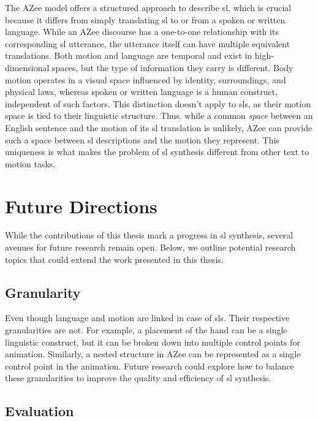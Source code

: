 \documentclass[../../main.tex]{subfiles}
\begin{document}
The AZee model offers a structured approach to describe \gls{sl}, which is crucial because it differs from simply translating \gls{sl} to or from a spoken or written language. While an AZee discourse has a one-to-one relationship with its corresponding \gls{sl} utterance, the utterance itself can have multiple equivalent translations. Both motion and language are temporal and exist in high-dimensional spaces, but the type of information they carry is different. Body motion operates in a visual space influenced by identity, surroundings, and physical laws, whereas spoken or written language is a human construct, independent of such factors. This distinction doesn't apply to \gls{sl}s, as their motion space is tied to their linguistic structure. Thus. while a common \emph{space} between an English sentence and the motion of its \gls{sl} translation is unlikely, AZee can provide such a space between \gls{sl} descriptions and the motion they represent. This uniqueness is what makes the problem of \gls{sl} synthesis different from other text to motion tasks.

\section{Future Directions}
\label{ch:conclusion:future}

While the contributions of this thesis mark a progress in \gls{sl} synthesis, several avenues for future research remain open. Below, we outline potential research topics that could extend the work presented in this thesis.

\subsection{Granularity}
\label{ch:conclusion:future:granularity}

Even though language and motion are linked in case of \gls{sl}s. Their respective granularities are not. For example, a placement of the hand can be a single linguistic construct, but it can be broken down into multiple control points for animation. Similarly, a nested structure in AZee can be represented as a single control point in the animation. Future research could explore how to balance these granularities to improve the quality and efficiency of \gls{sl} synthesis.

\subsection{Evaluation}
\label{ch:conclusion:future:evaluation}
\end{document}

